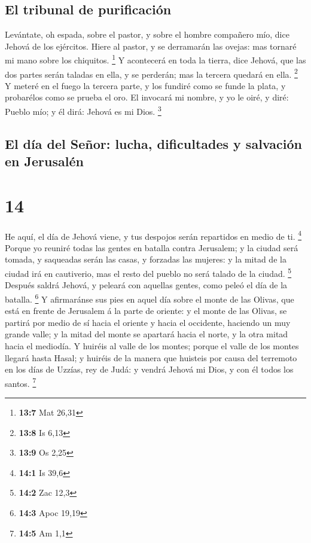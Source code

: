 \hypertarget{el-tribunal-de-purificaciuxf3n}{%
\subsection{El tribunal de
purificación}\label{el-tribunal-de-purificaciuxf3n}}

 Levántate, oh espada, sobre el pastor, y sobre el hombre
compañero mío, dice Jehová de los ejércitos. Hiere al pastor, y se
derramarán las ovejas: mas tornaré mi mano sobre los chiquitos.
\footnote{\textbf{13:7} Mat 26,31}  Y acontecerá en toda la
tierra, dice Jehová, que las dos partes serán taladas en ella, y se
perderán; mas la tercera quedará en ella. \footnote{\textbf{13:8} Is
  6,13}  Y meteré en el fuego la tercera parte, y los
fundiré como se funde la plata, y probarélos como se prueba el oro. El
invocará mi nombre, y yo le oiré, y diré: Pueblo mío; y él dirá: Jehová
es mi Dios. \footnote{\textbf{13:9} Os 2,25}

\hypertarget{el-duxeda-del-seuxf1or-lucha-dificultades-y-salvaciuxf3n-en-jerusaluxe9n}{%
\subsection{El día del Señor: lucha, dificultades y salvación en
Jerusalén}\label{el-duxeda-del-seuxf1or-lucha-dificultades-y-salvaciuxf3n-en-jerusaluxe9n}}

\hypertarget{section-13}{%
\section{14}\label{section-13}}

 He aquí, el día de Jehová viene, y tus despojos serán
repartidos en medio de ti. \footnote{\textbf{14:1} Is 39,6} 
Porque yo reuniré todas las gentes en batalla contra Jerusalem; y la
ciudad será tomada, y saqueadas serán las casas, y forzadas las mujeres:
y la mitad de la ciudad irá en cautiverio, mas el resto del pueblo no
será talado de la ciudad. \footnote{\textbf{14:2} Zac 12,3} 
Después saldrá Jehová, y peleará con aquellas gentes, como peleó el día
de la batalla. \footnote{\textbf{14:3} Apoc 19,19}  Y
afirmaránse sus pies en aquel día sobre el monte de las Olivas, que está
en frente de Jerusalem á la parte de oriente: y el monte de las Olivas,
se partirá por medio de sí hacia el oriente y hacia el occidente,
haciendo un muy grande valle; y la mitad del monte se apartará hacia el
norte, y la otra mitad hacia el mediodía.  Y huiréis al
valle de los montes; porque el valle de los montes llegará hasta Hasal;
y huiréis de la manera que huisteis por causa del terremoto en los días
de Uzzías, rey de Judá: y vendrá Jehová mi Dios, y con él todos los
santos. \footnote{\textbf{14:5} Am 1,1}

